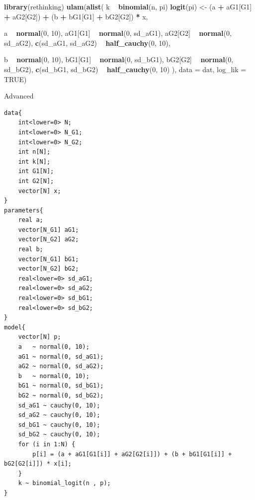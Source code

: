 \documentclass[11pt, oneside, openany]{scrbook}
\newenvironment{Shaded}{\begin{snugshade}}{\end{snugshade}}
\newcommand{\DataTypeTok}[1]{\textcolor[rgb]{0.13,0.29,0.53}{#1}}
\newcommand{\DecValTok}[1]{\textcolor[rgb]{0.00,0.00,0.81}{#1}}
\newcommand{\KeywordTok}[1]{\textcolor[rgb]{0.13,0.29,0.53}{\textbf{#1}}}
\newcommand{\NormalTok}[1]{#1}
\newcommand{\OperatorTok}[1]{\textcolor[rgb]{0.81,0.36,0.00}{\textbf{#1}}}
\newcommand{\OtherTok}[1]{\textcolor[rgb]{0.56,0.35,0.01}{#1}}
\newcommand{\StringTok}[1]{\textcolor[rgb]{0.31,0.60,0.02}{#1}}
\begin{document}
\begin{Shaded}
\begin{Highlighting}[]
\KeywordTok{library}\NormalTok{(rethinking)}
\KeywordTok{ulam}\NormalTok{(}\KeywordTok{alist}\NormalTok{(}
\NormalTok{  k }\OperatorTok{~}\StringTok{ }\KeywordTok{binomial}\NormalTok{(n, pi)}
  \KeywordTok{logit}\NormalTok{(pi) <-}\StringTok{ }\NormalTok{(a }\OperatorTok{+}\StringTok{ }\NormalTok{aG1[G1] }\OperatorTok{+}\StringTok{ }\NormalTok{aG2[G2]) }\OperatorTok{+}\StringTok{ }\NormalTok{(b }\OperatorTok{+}\StringTok{ }\NormalTok{bG1[G1] }\OperatorTok{+}\StringTok{ }\NormalTok{bG2[G2]) }\OperatorTok{*}\StringTok{ }\NormalTok{x,}
  
\NormalTok{  a }\OperatorTok{~}\StringTok{ }\KeywordTok{normal}\NormalTok{(}\DecValTok{0}\NormalTok{, }\DecValTok{10}\NormalTok{),}
\NormalTok{  aG1[G1] }\OperatorTok{~}\StringTok{ }\KeywordTok{normal}\NormalTok{(}\DecValTok{0}\NormalTok{, sd_aG1),}
\NormalTok{  aG2[G2] }\OperatorTok{~}\StringTok{ }\KeywordTok{normal}\NormalTok{(}\DecValTok{0}\NormalTok{, sd_aG2),}
  \KeywordTok{c}\NormalTok{(sd_aG1, sd_aG2) }\OperatorTok{~}\StringTok{ }\KeywordTok{half_cauchy}\NormalTok{(}\DecValTok{0}\NormalTok{, }\DecValTok{10}\NormalTok{),}

\NormalTok{  b }\OperatorTok{~}\StringTok{ }\KeywordTok{normal}\NormalTok{(}\DecValTok{0}\NormalTok{, }\DecValTok{10}\NormalTok{),}
\NormalTok{  bG1[G1] }\OperatorTok{~}\StringTok{ }\KeywordTok{normal}\NormalTok{(}\DecValTok{0}\NormalTok{, sd_bG1),}
\NormalTok{  bG2[G2] }\OperatorTok{~}\StringTok{ }\KeywordTok{normal}\NormalTok{(}\DecValTok{0}\NormalTok{, sd_bG2),}
  \KeywordTok{c}\NormalTok{(sd_bG1, sd_bG2) }\OperatorTok{~}\StringTok{ }\KeywordTok{half_cauchy}\NormalTok{(}\DecValTok{0}\NormalTok{, }\DecValTok{10}\NormalTok{)}
\NormalTok{), }\DataTypeTok{data =}\NormalTok{ dat, }\DataTypeTok{log_lik =} \OtherTok{TRUE}\NormalTok{)}
\end{Highlighting}
\end{Shaded}


Advanced


\begin{verbatim}
data{
    int<lower=0> N;
    int<lower=0> N_G1;
    int<lower=0> N_G2;
    int n[N];
    int k[N];
    int G1[N];
    int G2[N];
    vector[N] x;
}
parameters{
    real a;
    vector[N_G1] aG1;
    vector[N_G2] aG2;
    real b;
    vector[N_G1] bG1;
    vector[N_G2] bG2;
    real<lower=0> sd_aG1;
    real<lower=0> sd_aG2;
    real<lower=0> sd_bG1;
    real<lower=0> sd_bG2;
}
model{
    vector[N] p;
    a   ~ normal(0, 10);
    aG1 ~ normal(0, sd_aG1);
    aG2 ~ normal(0, sd_aG2);
    b   ~ normal(0, 10);
    bG1 ~ normal(0, sd_bG1);
    bG2 ~ normal(0, sd_bG2);
    sd_aG1 ~ cauchy(0, 10);
    sd_aG2 ~ cauchy(0, 10);
    sd_bG1 ~ cauchy(0, 10);
    sd_bG2 ~ cauchy(0, 10);
    for (i in 1:N) {
        p[i] = (a + aG1[G1[i]] + aG2[G2[i]]) + (b + bG1[G1[i]] + bG2[G2[i]]) * x[i];
    }
    k ~ binomial_logit(n , p);
}
\end{verbatim}
\end{document}
